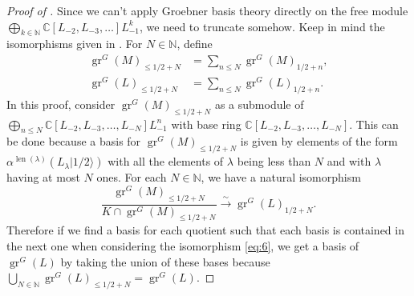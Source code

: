 \documentclass[12pt, a4paper]{article}
\DeclareMathOperator{\gr}{gr}
\DeclareMathOperator{\len}{len}
\newcommand{\vachalf}{|1/2\rangle}
\begin{document}
\begin{proof}[Proof of ]
  Since we can't apply Groebner basis theory directly on the free module $\bigoplus_{k\in \mathbb{N}}\mathbb{C}[L_{-2},L_{-3},\dots]L_{-1}^k$, we need to truncate somehow.
  Keep in mind the isomorphisms given in .
  For $N \in \mathbb{N}$, define
  \begin{align*}
    \gr^G(M)_{\le 1/2 + N} &= \sum_{n \le N}\gr^G(M)_{1/2 + n}, \\
    \gr^G(L)_{\le 1/2 + N} &= \sum_{n \le N}\gr^G(L)_{1/2 + n}.
  \end{align*}
  In this proof, consider $\gr^G(M)_{\le 1/2 + N}$ as a submodule of $\bigoplus_{n \le N}\mathbb{C}[L_{-2}, L_{-3}, \dots, L_{-N}]L_{-1}^n$ with base ring $\mathbb{C}[L_{-2}, L_{-3}, \dots, L_{-N}]$.
  This can be done because a basis for $\gr^G(M)_{\le 1/2 + N}$ is given by elements of the form $\alpha^{\len(\lambda)}(L_\lambda\vachalf)$ with all the elements of $\lambda$ being less than $N$ and with $\lambda$ having at most $N$ ones.
  For each $N \in \mathbb{N}$, we have a natural isomorphism
  \begin{equation}
    \label{eq:6}
    \frac{\gr^G(M)_{\le 1/2 + N}}{K \cap \gr^G(M)_{\le 1/2 + N}} \xrightarrow{\sim} \gr^G(L)_{1/2 + N}.
  \end{equation}
  Therefore if we find a basis for each quotient such that each basis is contained in the next one when considering the isomorphism \eqref{eq:6}, we get a basis of $\gr^G(L)$ by taking the union of these bases because $\bigcup_{N \in \mathbb{N}}\gr^G(L)_{\le 1/2 + N} = \gr^G(L)$.
  

\end{proof}
\end{document}

